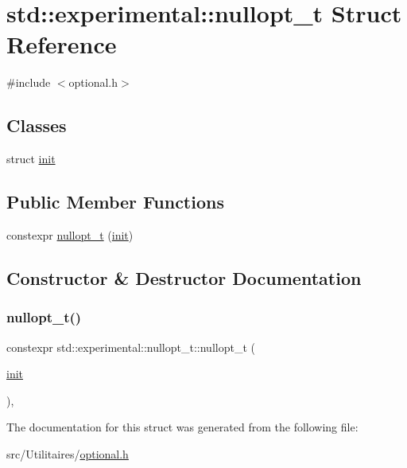 \hypertarget{structstd_1_1experimental_1_1nullopt__t}{}\section{std\+:\+:experimental\+:\+:nullopt\+\_\+t Struct Reference}
\label{structstd_1_1experimental_1_1nullopt__t}


{\ttfamily \#include $<$optional.\+h$>$}

\subsection*{Classes}
\begin{DoxyCompactItemize}
\item 
struct \mbox{\hyperlink{structstd_1_1experimental_1_1nullopt__t_1_1init}{init}}
\end{DoxyCompactItemize}
\subsection*{Public Member Functions}
\begin{DoxyCompactItemize}
\item 
constexpr \mbox{\hyperlink{structstd_1_1experimental_1_1nullopt__t_a70943f47c66aea7fa3c15facd6617dc1}{nullopt\+\_\+t}} (\mbox{\hyperlink{structstd_1_1experimental_1_1nullopt__t_1_1init}{init}})
\end{DoxyCompactItemize}


\subsection{Constructor \& Destructor Documentation}
\mbox{\label{structstd_1_1experimental_1_1nullopt__t_a70943f47c66aea7fa3c15facd6617dc1}} 
\subsubsection{\texorpdfstring{nullopt\+\_\+t()}{nullopt\_t()}}
{\footnotesize\ttfamily constexpr std\+::experimental\+::nullopt\+\_\+t\+::nullopt\+\_\+t (\begin{DoxyParamCaption}\item[{\mbox{\hyperlink{structstd_1_1experimental_1_1nullopt__t_1_1init}{init}}}]{ }\end{DoxyParamCaption})\hspace{0.3cm}{\ttfamily [inline]}, {\ttfamily [explicit]}}



The documentation for this struct was generated from the following file\+:\begin{DoxyCompactItemize}
\item 
src/\+Utilitaires/\mbox{\hyperlink{optional_8h}{optional.\+h}}\end{DoxyCompactItemize}
